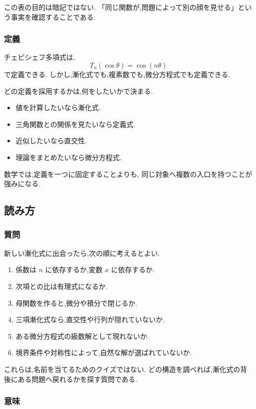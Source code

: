 この表の目的は暗記ではない.
「同じ関数が,問題によって別の顔を見せる」という事実を確認することである.

\subsubsection{定義}

チェビシェフ多項式は,
\[
  T_n(\cos\theta)=\cos(n\theta)
\]
で定義できる.
しかし,漸化式でも,複素数でも,微分方程式でも定義できる.

どの定義を採用するかは,何をしたいかで決まる.

\begin{itemize}
  \item 値を計算したいなら漸化式.
  \item 三角関数との関係を見たいなら定義式.
  \item 近似したいなら直交性.
  \item 理論をまとめたいなら微分方程式.
\end{itemize}

数学では,定義を一つに固定することよりも,
同じ対象へ複数の入口を持つことが強みになる.

\subsection{読み方}

\subsubsection{質問}

新しい漸化式に出会ったら,次の順に考えるとよい.

\begin{enumerate}
  \item 係数は $n$ に依存するか,変数 $x$ に依存するか.
  \item 次項との比は有理式になるか.
  \item 母関数を作ると,微分や積分で閉じるか.
  \item 三項漸化式なら,直交性や行列が隠れていないか.
  \item ある微分方程式の級数解として現れないか.
  \item 境界条件や対称性によって,自然な解が選ばれていないか.
\end{enumerate}

これらは,名前を当てるためのクイズではない.
どの構造を調べれば,漸化式の背後にある問題へ戻れるかを探す質問である.

\subsubsection{意味}

